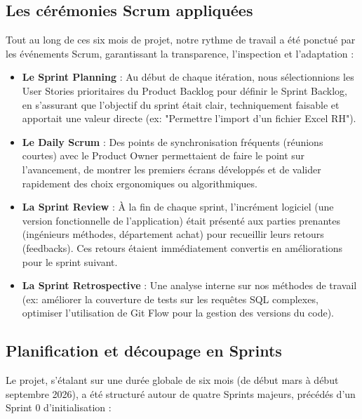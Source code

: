 \subsection{Les cérémonies Scrum appliquées}
Tout au long de ces six mois de projet, notre rythme de travail a été ponctué par les événements Scrum, garantissant la transparence, l'inspection et l'adaptation :
\begin{itemize}
    \item \textbf{Le Sprint Planning} : Au début de chaque itération, nous sélectionnions les User Stories prioritaires du Product Backlog pour définir le Sprint Backlog, en s'assurant que l'objectif du sprint était clair, techniquement faisable et apportait une valeur directe (ex: "Permettre l'import d'un fichier Excel RH").
    \item \textbf{Le Daily Scrum} : Des points de synchronisation fréquents (réunions courtes) avec le Product Owner permettaient de faire le point sur l'avancement, de montrer les premiers écrans développés et de valider rapidement des choix ergonomiques ou algorithmiques.
    \item \textbf{La Sprint Review} : À la fin de chaque sprint, l'incrément logiciel (une version fonctionnelle de l'application) était présenté aux parties prenantes (ingénieurs méthodes, département achat) pour recueillir leurs retours (feedbacks). Ces retours étaient immédiatement convertis en améliorations pour le sprint suivant.
    \item \textbf{La Sprint Retrospective} : Une analyse interne sur nos méthodes de travail (ex: améliorer la couverture de tests sur les requêtes SQL complexes, optimiser l'utilisation de Git Flow pour la gestion des versions du code).
\end{itemize}

\subsection{Planification et découpage en Sprints}
Le projet, s'étalant sur une durée globale de six mois (de début mars à début septembre 2026), a été structuré autour de quatre Sprints majeurs, précédés d'un Sprint 0 d'initialisation :

